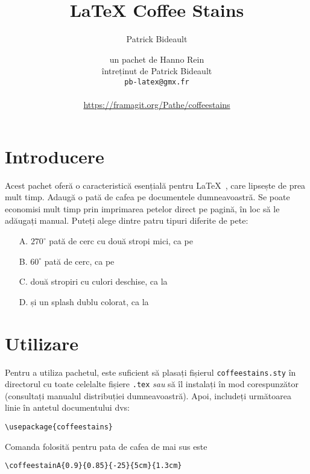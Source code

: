 \documentclass[a4paper, 11pt, BCOR = 0 pt, oneside]{scrartcl}
\author{Patrick Bideault}
\begin{document}
\title{LaTeX Coffee Stains}
\author{un pachet de Hanno Rein\\
întreținut de Patrick Bideault\\%
  \texttt{pb-latex@gmx.fr}\\
  ~\\
  \url{https://framagit.org/Pathe/coffeestains}}
\renewcommand{\today}{Versiunea \gitRel{} -- \DTMtoday{}}
\maketitle

\label{stainA}
\section{Introducere}
Acest pachet oferă o caracteristică esențială pentru \LaTeX~, care lipsește de prea mult timp. Adaugă o pată de cafea pe documentele dumneavoastră. Se poate economisi mult timp prin imprimarea petelor direct pe pagină, în loc să le adăugați manual. Puteți alege dintre patru tipuri diferite de pete:
\begin{itemize}
\item[A.] $270^\circ$ pată de cerc cu două stropi mici, ca pe 
  \item[B.] $60^\circ$ pată de cerc, ca pe 
  \item[C.] două stropiri cu culori deschise, ca la 
  \item[D.] și un splash dublu colorat, ca la 
\end{itemize}

\section{Utilizare}
Pentru a utiliza pachetul, este suficient să plasați fișierul \texttt{coffeestains.sty} în directorul cu toate celelalte fișiere \texttt{.tex} \emph{sau} să îl instalați în mod corespunzător (consultați manualul distribuției dumneavoastră). Apoi, includeți următoarea linie în antetul documentului dvs:
\begin{verbatim}
\usepackage{coffeestains}
\end{verbatim}

\vfill{}

\begin{tcolorbox}
Comanda folosită pentru pata de cafea de mai sus este

  \verb|\coffeestainA{0.9}{0.85}{-25}{5cm}{1.3cm}|
\end{tcolorbox}
\newpage{}
\label{stainB}
\end{document}
